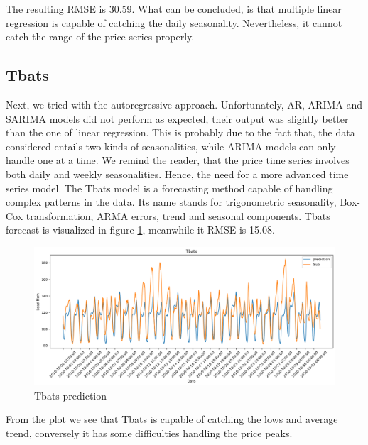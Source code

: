 The resulting RMSE is 30.59.
What can be concluded, is that multiple linear regression is capable of catching the daily seasonality. Nevertheless, it cannot catch the range of the price series properly.

\subsection{Tbats}
Next, we tried with the autoregressive approach. Unfortunately, AR, ARIMA and SARIMA models did not perform as expected, their output was slightly better than the one of linear regression. This is probably due to the fact that, the data considered entails two kinds of seasonalities, while ARIMA models can only handle one at a time. We remind the reader, that the price time series involves both daily and weekly seasonalities. Hence, the need for a more advanced time series model. The Tbats model is a forecasting method capable of handling complex patterns in the data. Its name stands for trigonometric seasonality, Box-Cox transformation, ARMA errors, trend and seasonal components. 
Tbats forecast is visualized in figure \ref{fig:tbats_price}, meanwhile it RMSE is 15.08.
\begin{figure}[!h]
    \includegraphics[width=\textwidth]{images/tbats_price.png}
    \caption{Tbats prediction}
    \label{fig:tbats_price}
\end{figure}
From the plot we see that Tbats is capable of catching the lows and average trend, conversely it has some difficulties handling the price peaks.
